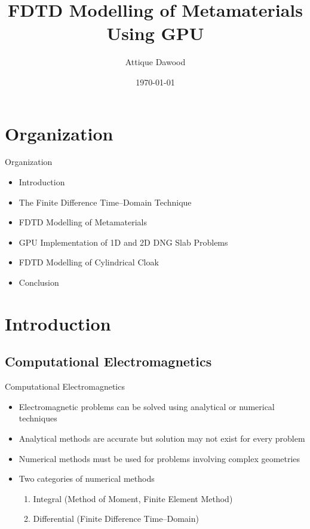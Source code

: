 \documentclass{beamer}
\title{FDTD Modelling of Metamaterials Using GPU}
\author{Attique Dawood}
\institute{FAST, Islamabad}
\date{\today}
\begin{document}
\begin{frame}
\titlepage
\end{frame}


\section{Organization}
\begin{frame}{Organization}
	\begin{itemize}
	\item Introduction
	\item The Finite Difference Time--Domain Technique
	\item FDTD Modelling of Metamaterials
	\item GPU Implementation of 1D and 2D DNG Slab Problems
	\item FDTD Modelling of Cylindrical Cloak
	\item Conclusion
	\end{itemize}
\end{frame}

\section{Introduction}
\subsection{Computational Electromagnetics}
\begin{frame}{Computational Electromagnetics}
	\begin{itemize}
	\item Electromagnetic problems can be solved using analytical or numerical techniques
	\item Analytical methods are accurate but solution may not exist for every problem
	\item Numerical methods must be used for problems involving complex geometries
	\item Two categories of numerical methods
	\begin{enumerate}
		\item Integral (Method of Moment, Finite Element Method)
		\item Differential (Finite Difference Time--Domain)
	\end{enumerate}
	\end{itemize}
\end{frame}
\end{document}
